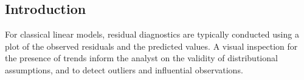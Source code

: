 \documentclass[12pt, a4paper]{article}
\begin{document}
\subsection{Introduction}













For classical linear models, residual diagnostics are typically conducted using a plot of the observed residuals and the predicted values. A visual inspection for the presence of trends inform the analyst on the validity of distributional assumptions, and to detect outliers and influential observations.

%
%
%
%
%
%
%
%
\end{document}
